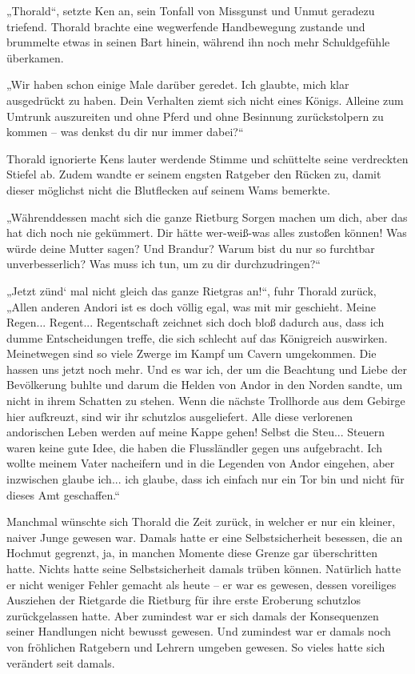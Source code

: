 „Thorald“, setzte Ken an, sein Tonfall von Missgunst und Unmut geradezu triefend. Thorald brachte eine wegwerfende Handbewegung zustande und brummelte etwas in seinen Bart hinein, während ihn noch mehr Schuldgefühle überkamen.

„Wir haben schon einige Male darüber geredet. Ich glaubte, mich klar ausgedrückt zu haben. Dein Verhalten ziemt sich nicht eines Königs. Alleine zum Umtrunk auszureiten und ohne Pferd und ohne Besinnung zurückstolpern zu kommen – was denkst du dir nur immer dabei?“

Thorald ignorierte Kens lauter werdende Stimme und schüttelte seine verdreckten Stiefel ab. Zudem wandte er seinem engsten Ratgeber den Rücken zu, damit dieser möglichst nicht die Blutflecken auf seinem Wams bemerkte.

„Währenddessen macht sich die ganze Rietburg Sorgen machen um dich, aber das hat dich noch nie gekümmert. Dir hätte wer-weiß-was alles zustoßen können! Was würde deine Mutter sagen? Und Brandur? Warum bist du nur so furchtbar unverbesserlich? Was muss ich tun, um zu dir durchzudringen?“

„Jetzt zünd‘ mal nicht gleich das ganze Rietgras an!“, fuhr Thorald zurück, „Allen anderen Andori ist es doch völlig egal, was mit mir geschieht. Meine Regen... Regent... Regentschaft zeichnet sich doch bloß dadurch aus, dass ich dumme Entscheidungen treffe, die sich schlecht auf das Königreich auswirken. Meinetwegen sind so viele Zwerge im Kampf um Cavern umgekommen. Die hassen uns jetzt noch mehr. Und es war ich, der um die Beachtung und Liebe der Bevölkerung buhlte und darum die Helden von Andor in den Norden sandte, um nicht in ihrem Schatten zu stehen. Wenn die nächste Trollhorde aus dem Gebirge hier aufkreuzt, sind wir ihr schutzlos ausgeliefert. Alle diese verlorenen andorischen Leben werden auf meine Kappe gehen! Selbst die Steu... Steuern waren keine gute Idee, die haben die Flussländler gegen uns aufgebracht. Ich wollte meinem Vater nacheifern und in die Legenden von Andor eingehen, aber inzwischen glaube ich... ich glaube, dass ich einfach nur ein Tor bin und nicht für dieses Amt geschaffen.“

Manchmal wünschte sich Thorald die Zeit zurück, in welcher er nur ein kleiner, naiver Junge gewesen war. Damals hatte er eine Selbstsicherheit besessen, die an Hochmut gegrenzt, ja, in manchen Momente diese Grenze gar überschritten hatte. Nichts hatte seine Selbstsicherheit damals trüben können. Natürlich hatte er nicht weniger Fehler gemacht als heute – er war es gewesen, dessen voreiliges Ausziehen der Rietgarde die Rietburg für ihre erste Eroberung schutzlos zurückgelassen hatte. Aber zumindest war er sich damals der Konsequenzen seiner Handlungen nicht bewusst gewesen. Und zumindest war er damals noch von fröhlichen Ratgebern und Lehrern umgeben gewesen. So vieles hatte sich verändert seit damals.

